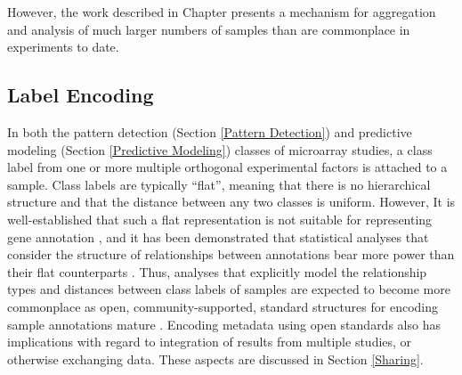 However, the work described in Chapter \celsiuschapter presents a mechanism for
aggregation and analysis of much larger numbers of samples than are commonplace
in experiments to date.

\subsection{Label Encoding}\label{Label Encoding}

In both the pattern detection (Section \ref{Pattern Detection}) and predictive
modeling (Section \ref{Predictive Modeling}) classes of microarray studies, a
class label from one or more multiple orthogonal experimental factors is
attached to a sample.  Class labels are typically ``flat'', meaning that there
is no hierarchical structure and that the distance between any two classes is
uniform.  However, It is well-established that such a flat representation is
not suitable for representing gene annotation \cite{go}, and it has been
demonstrated that statistical analyses that consider the structure of
relationships between annotations bear more power than their flat counterparts
\cite{ease,gocluster,pachinko}.  Thus, analyses that explicitly model the
relationship types and distances between class labels of samples are expected
to become more commonplace as open, community-supported, standard structures
for encoding sample annotations mature \cite{so, obo, mpath, cl, mo, ma, mpath,
mp}.  Encoding metadata using open standards also has implications with regard
to integration of results from multiple studies, or otherwise exchanging data.
These aspects are discussed in Section \ref{Sharing}.
